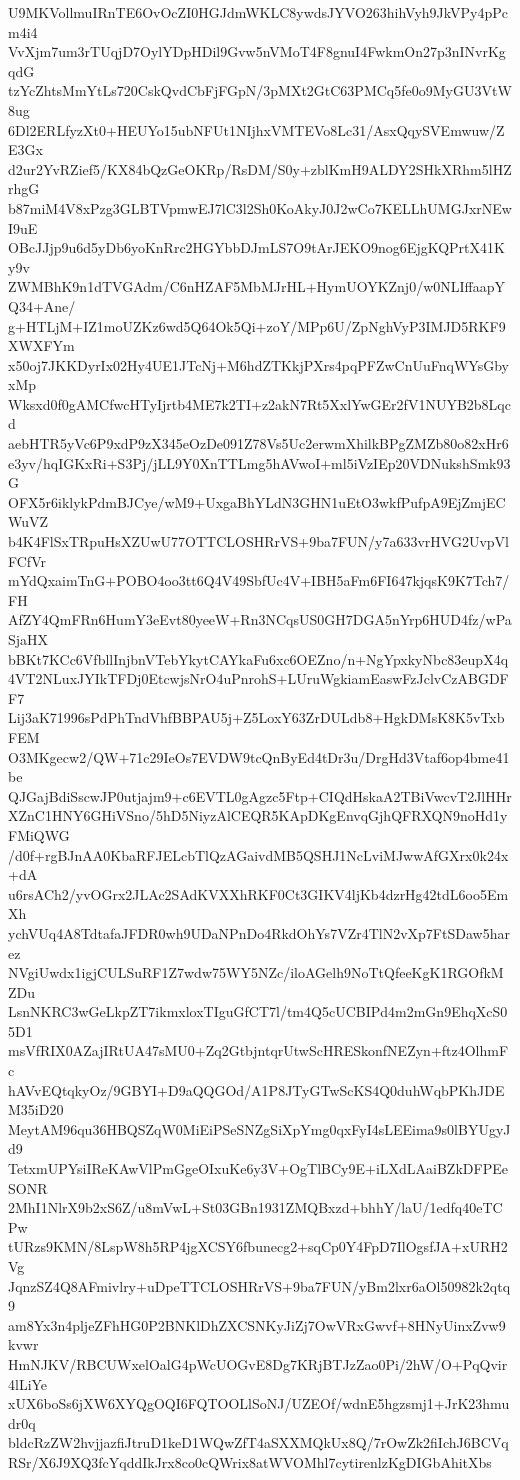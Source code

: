 U9MKVollmuIRnTE6OvOcZI0HGJdmWKLC8ywdsJYVO263hihVyh9JkVPy4pPcm4i4
VvXjm7um3rTUqjD7OylYDpHDil9Gvw5nVMoT4F8gnuI4FwkmOn27p3nINvrKgqdG
tzYcZhtsMmYtLs720CskQvdCbFjFGpN/3pMXt2GtC63PMCq5fe0o9MyGU3VtW8ug
6Dl2ERLfyzXt0+HEUYo15ubNFUt1NIjhxVMTEVo8Lc31/AsxQqySVEmwuw/ZE3Gx
d2ur2YvRZief5/KX84bQzGeOKRp/RsDM/S0y+zblKmH9ALDY2SHkXRhm5lHZrhgG
b87miM4V8xPzg3GLBTVpmwEJ7lC3l2Sh0KoAkyJ0J2wCo7KELLhUMGJxrNEwI9uE
OBcJJjp9u6d5yDb6yoKnRrc2HGYbbDJmLS7O9tArJEKO9nog6EjgKQPrtX41Ky9v
ZWMBhK9n1dTVGAdm/C6nHZAF5MbMJrHL+HymUOYKZnj0/w0NLIffaapYQ34+Ane/
g+HTLjM+IZ1moUZKz6wd5Q64Ok5Qi+zoY/MPp6U/ZpNghVyP3IMJD5RKF9XWXFYm
x50oj7JKKDyrIx02Hy4UE1JTcNj+M6hdZTKkjPXrs4pqPFZwCnUuFnqWYsGbyxMp
Wksxd0f0gAMCfwcHTyIjrtb4ME7k2TI+z2akN7Rt5XxlYwGEr2fV1NUYB2b8Lqcd
aebHTR5yVc6P9xdP9zX345eOzDe091Z78Vs5Uc2erwmXhilkBPgZMZb80o82xHr6
e3yv/hqIGKxRi+S3Pj/jLL9Y0XnTTLmg5hAVwoI+ml5iVzIEp20VDNukshSmk93G
OFX5r6iklykPdmBJCye/wM9+UxgaBhYLdN3GHN1uEtO3wkfPufpA9EjZmjECWuVZ
b4K4FlSxTRpuHsXZUwU77OTTCLOSHRrVS+9ba7FUN/y7a633vrHVG2UvpVlFCfVr
mYdQxaimTnG+POBO4oo3tt6Q4V49SbfUc4V+IBH5aFm6FI647kjqsK9K7Tch7/FH
AfZY4QmFRn6HumY3eEvt80yeeW+Rn3NCqsUS0GH7DGA5nYrp6HUD4fz/wPaSjaHX
bBKt7KCc6VfbllInjbnVTebYkytCAYkaFu6xc6OEZno/n+NgYpxkyNbc83eupX4q
4VT2NLuxJYIkTFDj0EtcwjsNrO4uPnrohS+LUruWgkiamEaswFzJclvCzABGDFF7
Lij3aK71996sPdPhTndVhfBBPAU5j+Z5LoxY63ZrDULdb8+HgkDMsK8K5vTxbFEM
O3MKgecw2/QW+71c29IeOs7EVDW9tcQnByEd4tDr3u/DrgHd3Vtaf6op4bme41be
QJGajBdiSscwJP0utjajm9+c6EVTL0gAgzc5Ftp+CIQdHskaA2TBiVwcvT2JlHHr
XZnC1HNY6GHiVSno/5hD5NiyzAlCEQR5KApDKgEnvqGjhQFRXQN9noHd1yFMiQWG
/d0f+rgBJnAA0KbaRFJELcbTlQzAGaivdMB5QSHJ1NcLviMJwwAfGXrx0k24x+dA
u6rsACh2/yvOGrx2JLAc2SAdKVXXhRKF0Ct3GIKV4ljKb4dzrHg42tdL6oo5EmXh
ychVUq4A8TdtafaJFDR0wh9UDaNPnDo4RkdOhYs7VZr4TlN2vXp7FtSDaw5harez
NVgiUwdx1igjCULSuRF1Z7wdw75WY5NZc/iloAGelh9NoTtQfeeKgK1RGOfkMZDu
LsnNKRC3wGeLkpZT7ikmxloxTIguGfCT7l/tm4Q5cUCBIPd4m2mGn9EhqXcS05D1
msVfRIX0AZajIRtUA47sMU0+Zq2GtbjntqrUtwScHRESkonfNEZyn+ftz4OlhmFc
hAVvEQtqkyOz/9GBYI+D9aQQGOd/A1P8JTyGTwScKS4Q0duhWqbPKhJDEM35iD20
MeytAM96qu36HBQSZqW0MiEiPSeSNZgSiXpYmg0qxFyI4sLEEima9s0lBYUgyJd9
TetxmUPYsiIReKAwVlPmGgeOIxuKe6y3V+OgTlBCy9E+iLXdLAaiBZkDFPEeSONR
2MhI1NlrX9b2xS6Z/u8mVwL+St03GBn1931ZMQBxzd+bhhY/laU/1edfq40eTCPw
tURzs9KMN/8LspW8h5RP4jgXCSY6fbunecg2+sqCp0Y4FpD7IlOgsfJA+xURH2Vg
JqnzSZ4Q8AFmivlry+uDpeTTCLOSHRrVS+9ba7FUN/yBm2lxr6aOl50982k2qtq9
am8Yx3n4pljeZFhHG0P2BNKlDhZXCSNKyJiZj7OwVRxGwvf+8HNyUinxZvw9kvwr
HmNJKV/RBCUWxelOalG4pWcUOGvE8Dg7KRjBTJzZao0Pi/2hW/O+PqQvir4lLiYe
xUX6boSs6jXW6XYQgOQI6FQTOOLlSoNJ/UZEOf/wdnE5hgzsmj1+JrK23hmudr0q
bldcRzZW2hvjjazfiJtruD1keD1WQwZfT4aSXXMQkUx8Q/7rOwZk2fiIchJ6BCVq
RSr/X6J9XQ3fcYqddIkJrx8co0cQWrix8atWVOMhl7cytirenlzKgDIGbAhitXbs
